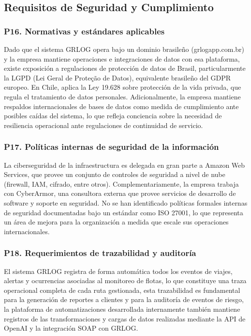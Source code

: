 \documentclass[12pt]{article}
\begin{document}
\subsection{Requisitos de Seguridad y Cumplimiento}

\subsubsection*{\textbf{P16. Normativas y est\'andares aplicables}}

Dado que el sistema GRLOG opera bajo un dominio brasileño (grlogapp.com.br) y la empresa mantiene
operaciones e integraciones de datos con esa plataforma, existe exposici\'on a regulaciones de
protecci\'on de datos de Brasil, particularmente la LGPD (Lei Geral de Prote\c{c}\~ao de
Datos), equivalente brasile\~no del GDPR europeo. En Chile, aplica la Ley 19.628 sobre
protecci\'on de la vida privada, que regula el tratamiento de datos personales. Adicionalmente,
la empresa mantiene respaldos internacionales de bases de datos como medida de cumplimiento ante
posibles ca\'idas del sistema, lo que refleja conciencia sobre la necesidad de resiliencia
operacional ante regulaciones de continuidad de servicio.

\subsubsection*{\textbf{P17. Pol\'iticas internas de seguridad de la informaci\'on}}

La ciberseguridad de la infraestructura es delegada en gran parte a Amazon Web Services, que
provee un conjunto de controles de seguridad a nivel de nube (firewall, IAM, cifrado, entre otros).
Complementariamente, la empresa trabaja con CyberArmor, una consultora externa que provee servicios
de desarrollo de software y soporte en seguridad. No se han identificado pol\'iticas formales internas
de seguridad documentadas bajo un est\'andar como ISO 27001, lo que representa un \'area de mejora
para la organizaci\'on a medida que escale sus operaciones internacionales.

\subsubsection*{\textbf{P18. Requerimientos de trazabilidad y auditor\'ia}}

El sistema GRLOG registra de forma autom\'atica todos los eventos de viajes, alertas y ocurrencias
asociadas al monitoreo de flotas, lo que constituye una traza operacional completa de cada ruta
gestionada, esta trazabilidad es fundamental para la generaci\'on de reportes a clientes y para
la auditor\'ia de eventos de riesgo, la plataforma de automatizaciones desarrollada internamente
tambi\'en mantiene registros de las transformaciones y cargas de datos realizadas mediante la
API de OpenAI y la integraci\'on SOAP con GRLOG.
\end{document}
